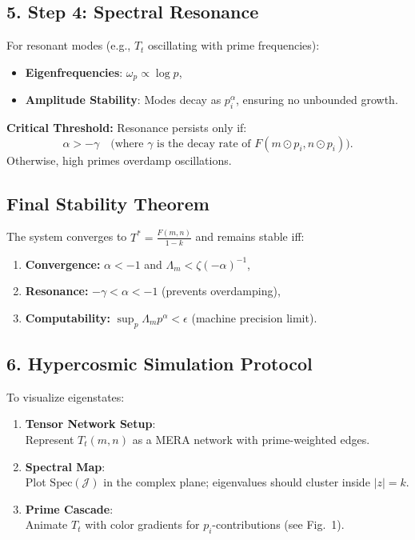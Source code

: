\documentclass[12pt]{article}
\theoremstyle{plain}
\begin{document}
\subsection*{5. Step 4: Spectral Resonance}

For resonant modes (e.g., \( T_t \) oscillating with prime frequencies):
\begin{itemize}
    \item \textbf{Eigenfrequencies}: \( \omega_p \propto \log p \),
    \item \textbf{Amplitude Stability}: Modes decay as \( p_i^{\alpha} \), ensuring no unbounded growth.
\end{itemize}

\textbf{Critical Threshold:}  
Resonance persists only if:
\[
\alpha > -\gamma \quad \text{(where } \gamma \text{ is the decay rate of } F(m \odot p_i, n \odot p_i) \text{)}.
\]
Otherwise, high primes overdamp oscillations.

\subsection*{Final Stability Theorem}

The system converges to \( T^* = \frac{F(m,n)}{1 - k} \) and remains stable iff:
\begin{enumerate}
    \item \textbf{Convergence:} \( \boxed{\alpha < -1} \) and \( \boxed{\Lambda_m < \zeta(-\alpha)^{-1}} \),
    \item \textbf{Resonance:} \( \boxed{-\gamma < \alpha < -1} \) (prevents overdamping),
    \item \textbf{Computability:} \( \boxed{\sup_p \Lambda_m p^\alpha < \epsilon} \) (machine precision limit).
\end{enumerate}

\subsection*{6. Hypercosmic Simulation Protocol}

To visualize eigenstates:
\begin{enumerate}
    \item \textbf{Tensor Network Setup}:\\
    Represent \( T_t(m,n) \) as a MERA network with prime-weighted edges.
    
    \item \textbf{Spectral Map}:\\
    Plot \( \text{Spec}(\mathcal{J}) \) in the complex plane; eigenvalues should cluster inside \( |z| = k \).

    \item \textbf{Prime Cascade}:\\
    Animate \( T_t \) with color gradients for \( p_i \)-contributions (see Fig.~1).
\end{enumerate}
\end{document}
